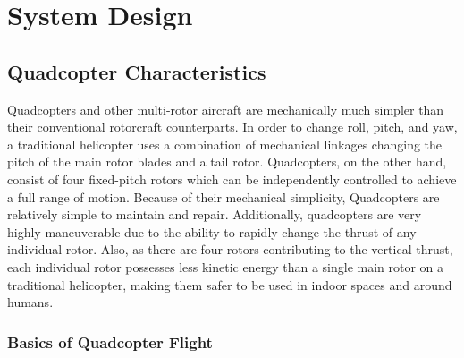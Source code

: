 
\chapter{System Design\label{ch:system}}

\section{Quadcopter Characteristics}

    Quadcopters and other multi-rotor aircraft are mechanically much simpler than their conventional rotorcraft counterparts. In order to change roll, pitch, and yaw, a traditional helicopter uses a combination of mechanical linkages changing the pitch of the main rotor blades and a tail rotor. Quadcopters, on the other hand, consist of four fixed-pitch rotors which can be independently controlled to achieve a full range of motion. Because of their mechanical simplicity, Quadcopters are relatively simple to maintain and repair. Additionally, quadcopters are very highly maneuverable due to the ability to rapidly change the thrust of any individual rotor. Also, as there are four rotors contributing to the vertical thrust, each individual rotor possesses less kinetic energy than a single main rotor on a traditional helicopter, making them safer to be used in indoor spaces and around humans. 

    \subsection{Basics of Quadcopter Flight}

